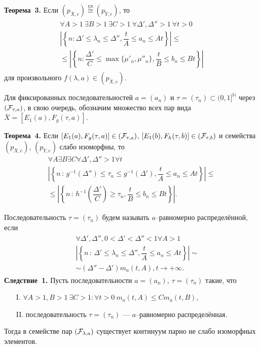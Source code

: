 \documentclass{vzmsthesis}
\begin{document}
\noindent\textbf{Теорема~3.}
Если 
$(p_{\overline{X},e})\stackrel{\text{сл}}{\cong}(p_{\overline{Y},e})$, то
\begin{eqnarray}
\begin{aligned}
\forall{A>1}\ \exists{B>1}\ \exists{C>1}\ \forall{\Delta', \Delta ''>1}\ \forall{t>0} \\
\left|\left\{
n:\Delta '\leqslant \lambda_n \leqslant \Delta'', \dfrac{t}{A} \leqslant a_n \leqslant At
\right\}\right| \leqslant  \\ \leqslant
\left|\left\{
n:\dfrac{\Delta'}{C}\leqslant \max\{\mu'_n,\mu''_n \}, \dfrac{t}{B} \leqslant b_n \leqslant Bt
\right\}\right|
\end{aligned} \label{Finv}
\end{eqnarray}
для произвольного $f(\lambda,a) \in (p_{\overline{X},e})$.

Для фиксированных последовательностей $a=(a_n)$ и $\tau  =(\tau_n)\subset (0,1]^{\mathbb N}$ через
$({\cal F}_{\tau ,a})$, в свою очередь, обозначим множество всех
пар вида $\overline{X}=[E_1(a),F_g(\tau  ,a)]$.

\noindent\textbf{Теорема~4.}
Если $[E_1(a),F_g(\tau  ,a)]\in ({\cal F}_{\tau  ,a})$, $[E_1(b),F_h(\tau  ,b)]\in ({\cal F}_{\tau  ,b})$ и семейства
$(p_{\overline{X},e})$, $(p_{\overline{Y},e})$ слабо изоморфны, то
\begin{eqnarray*}
\forall{A}\exists{B}\exists{C}\forall{\Delta ',\Delta ''>1} \forall{t}\\
\left|\left\{
n\,:\,g^{-1}(\Delta '') \leqslant \tau_n \leqslant g^{-1}(\Delta'),\dfrac{t}{A}\leqslant a_n \leqslant At
\right\}\right|\leqslant\\ \leqslant
\left|\left\{
n\,:\,h^{-1}\left(\dfrac{\Delta'}{C}\right)\geqslant \tau_n ,\dfrac{t}{B}\leqslant b_n \leqslant Bt
\right\}\right|.
\end{eqnarray*}

Последовательность $\tau  =(\tau_n)$ будем называть $a$--равномерно распределённой, если
\begin{eqnarray}
\begin{aligned}
&&\forall{\Delta ',\Delta '',0<\Delta '<\Delta ''<1} \forall{A>1} \\
&&\left|\left\{ n\,:\, \Delta '\leqslant \lambda_n \leqslant \Delta '',
\dfrac{t}{A}\leqslant a_n\leqslant At\right\}\right|\sim \\ 
&&\sim
(\Delta ''-\Delta ')m_a(t,A), t\to+\infty .
\end{aligned}\nonumber
\end{eqnarray}
\noindent\textbf{Следствие~1.}
Пусть последовательности $a=(a_n)$, $\tau=(\tau_n)$ такие, что
\begin{itemize}
\item[I.] $\forall{A>1, B>1}\ \exists{C>1:}\forall{t>0}\  m_a(t,A)\leqslant C m_a(t,B)$,
\item[II.] последовательность $\tau=(\tau_n)$ --- $a$--равномерно распределённая.
\end{itemize}
Тогда в семействе
пар $({\cal F}_{\lambda ,a})$ существует континуум парно не слабо изоморфных элементов.
\end{document}
